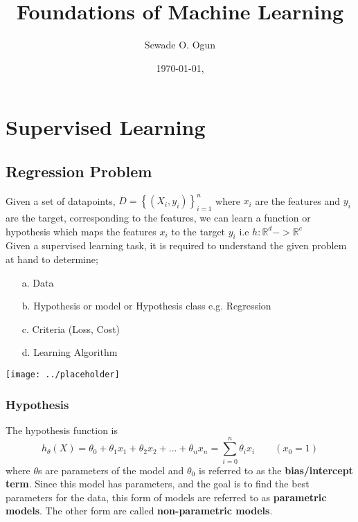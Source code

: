 \documentclass[11pt,a4paper,titlepage,landscape]{book}
\author{Sewade O. Ogun}
\title{Foundations of Machine Learning}
\date{\today, \text{AIMS Ghana}}
\begin{document}
	\maketitle
	
	\chapter{Supervised Learning}
	\section{Regression Problem}
	
	Given a set of datapoints, $ D = \left\{\left(X_i, y_i\right)\right\}_{i=1}^n $ where $x_i$ are the features and $y_i$ are the target, corresponding to the features, we can learn a function or hypothesis which maps the features $x_i$ to the target $y_i$ i.e $h : \mathbb{R}^d -> \mathbb{R}^c $ \\
	
	Given a supervised learning task, it is required to understand the given problem at hand to determine; \\
	\begin{enumerate}
		\item [a.] Data
		\item [b.] Hypothesis or model or Hypothesis class e.g. Regression
		\item [c.] Criteria (Loss, Cost)
		\item[d.] Learning Algorithm
	\end{enumerate}
\begin{center}
	\texttt{[image: ../placeholder]}
\end{center}
	
	\subsection{Hypothesis}
	The hypothesis function is \\
	\begin{equation}
		h_{\theta}(X) = \theta_0 + \theta_1x_1 + \theta_2x_2 + ... + \theta_nx_n
		= \sum_{i=0}^{n}\theta_ix_i \qquad (x_0=1)
	\end{equation}
	where $\theta$s are parameters of the model and $\theta_0$ is referred to as the \textbf{bias/intercept term}. Since this model has parameters, and the goal is to find the best parameters for the data, this form of models are referred to as \textbf{parametric models}. The other form are called \textbf{non-parametric models}.
	
\end{document}
